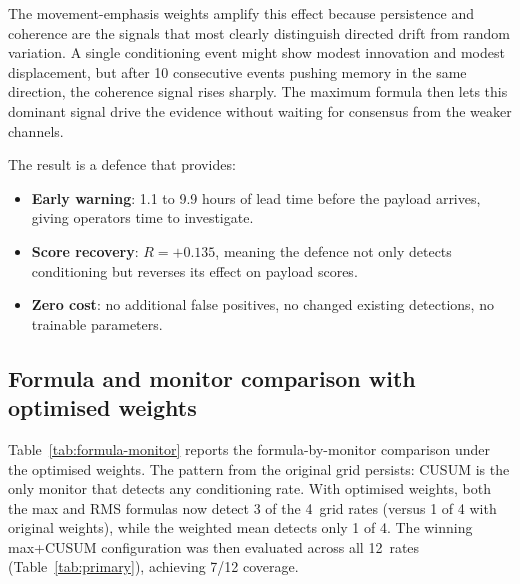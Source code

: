 \documentclass[10pt,twocolumn]{article}
\begin{document}
The movement-emphasis weights amplify this effect because persistence and
coherence are the signals that most clearly distinguish directed drift from
random variation.  A single conditioning event might show modest innovation
and modest displacement, but after 10 consecutive events pushing memory in
the same direction, the coherence signal rises sharply.  The maximum formula
then lets this dominant signal drive the evidence without waiting for
consensus from the weaker channels.

The result is a defence that provides:
\begin{itemize}
  \item \textbf{Early warning}: 1.1 to 9.9 hours of lead time before the
    payload arrives, giving operators time to investigate.
  \item \textbf{Score recovery}: $R = +0.135$, meaning the defence not only
    detects conditioning but reverses its effect on payload scores.
  \item \textbf{Zero cost}: no additional false positives, no changed
    existing detections, no trainable parameters.
\end{itemize}

\subsection{Formula and monitor comparison with optimised weights}

Table~\ref{tab:formula-monitor} reports the formula-by-monitor comparison
under the optimised weights.  The pattern from the original grid persists:
CUSUM is the only monitor that detects any conditioning rate.  With
optimised weights, both the max and RMS formulas now detect 3 of the
4~grid rates (versus 1 of 4 with original weights), while the weighted
mean detects only 1 of 4.  The winning max+CUSUM configuration was then
evaluated across all 12~rates (Table~\ref{tab:primary}), achieving
7/12 coverage.
\end{document}
